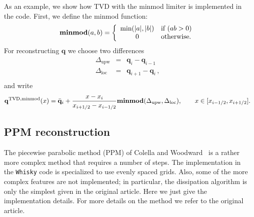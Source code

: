 \documentclass{article}
\begin{document}
As an example, we show how TVD with the minmod limiter is implemented
in the code. First, we define the minmod function:
\begin{equation}
  \label{eq:tvdminmod}
  \mathrm{\mathbf{minmod}}(a,b) = \left\{ \begin{array}{c l} 
      \textrm{min}(|a|,|b|) & \textrm{if } (a b > 0)\\
      0 & \textrm{otherwise}. \end{array}\right.
\end{equation}
For reconstructing $\mathbf{q}$ %
we choose two differences
\begin{equation}
  \begin{array}{lcl}
    \Delta_{\mathrm{upw}} & = & \mathbf{q}_i - \mathbf{q}_{i-1}\\
    \Delta_{\mathrm{loc}} & = & \mathbf{q}_{i+1} - \mathbf{q}_{i}\,,\\
  \end{array}
\end{equation}
and write
\begin{equation}
  {\bf q}^{{\rm TVD,minmod}}(x) = \bar{{\bf q}}_i + \frac{x -
  x_i}{x_{i+1/2} - x_{i-1/2}} \mathbf{minmod}(\Delta_{\mathrm{upw}},\Delta_{\mathrm{loc}}), 
    \qquad x \in [
  x_{i-1/2}, x_{i+1/2} ]. 
\end{equation}
\subsection{PPM reconstruction}
\label{sec:ppm}

The piecewise parabolic method (PPM) of Colella and
Woodward~\cite{ppm} is a rather more complex method that requires a
number of steps. The implementation in the {\tt Whisky} code is specialized
to use evenly spaced grids. Also, some of the more complex features are not
implemented; in particular, the dissipation algorithm is only the
simplest given in the original article. Here we just give the implementation
details. For more details on the method we refer to the original
article.
\end{document}
